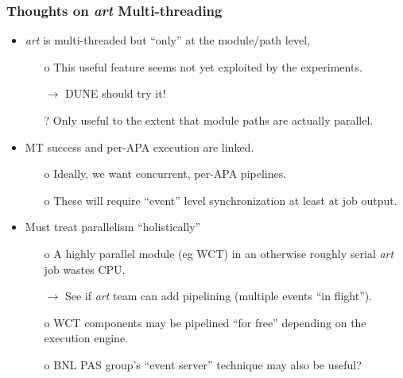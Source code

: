 \documentclass[xcolor=dvipsnames]{beamer}
\begin{document}
\begin{frame}
  \frametitle{Thoughts on \textit{art} Multi-threading}
  \begin{itemize}\footnotesize
  \item \textit{art} is multi-threaded but ``only'' at the module/path level, 
    \begin{itemize}\scriptsize
    \item[o] This useful feature seems not yet exploited by the experiments. 
    \item[$\to$] DUNE should try it!
    \item[?] Only useful to the extent that module paths are actually parallel.
    \end{itemize}
  \item MT success and per-APA execution are linked.
    \begin{itemize}\scriptsize
    \item[o] Ideally, we want concurrent, per-APA pipelines.
    \item[o] These will require ``event'' level synchronization at least at job output.
    \end{itemize}
  \item Must treat parallelism ``holistically''
    \begin{itemize}\scriptsize
    \item[o] A highly parallel module (eg WCT) in an otherwise roughly serial \textit{art} job wastes CPU.
    \item[$\to$] See if \textit{art} team can add pipelining (multiple events ``in flight'').
    \item[o] WCT components may be pipelined ``for free'' depending on the execution engine.
    \item[o] BNL PAS group's ``event server'' technique may also be useful?
    \end{itemize}
  \end{itemize}
\end{frame}
\end{document}
